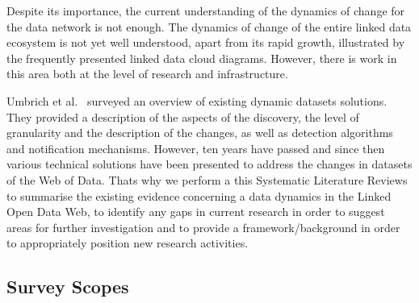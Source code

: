 \documentclass[sw]{iosart2x}
\begin{document}

Despite its importance, the current understanding of the dynamics of change for the data network is not enough. The dynamics of change of the entire linked data ecosystem is not yet well understood, apart from its rapid growth, illustrated by the frequently presented linked data cloud diagrams. However, there is work in this area both at the level of research and infrastructure.

Umbrich et al.~\cite{UmbrichVH10} surveyed an overview of existing dynamic datasets solutions. They provided a description of the aspects of the discovery, the level of granularity and the description of the changes, as well as detection algorithms and notification mechanisms. However, ten years have passed and since then various technical solutions have been presented to address the changes in datasets of the Web of Data. Thats why we perform a this Systematic Literature Reviews to summarise the existing evidence concerning a data dynamics in the Linked Open Data Web, to identify any gaps in current research in order to suggest areas for further investigation and to provide a framework/background in order to appropriately position new research activities.

\subsection{Survey Scopes}\label{Scopes}

\end{document}
